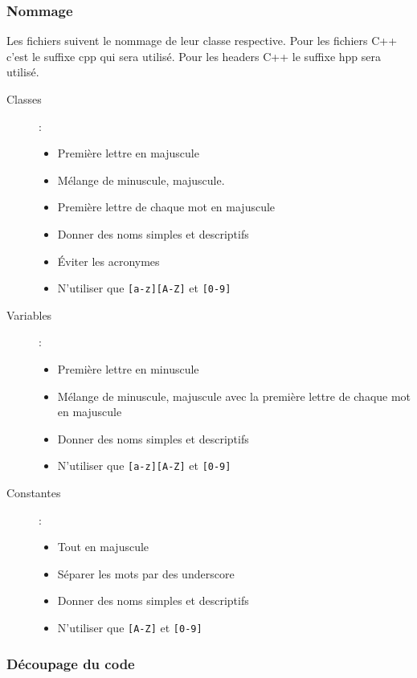 \documentclass[10pt,a4paper]{article}
\begin{document}
\subsubsection{Nommage}

Les fichiers suivent le nommage de leur classe respective.
Pour les fichiers C++ c'est le suffixe cpp qui sera utilisé. Pour les headers C++ le suffixe hpp sera utilisé.
\begin{description}
\item [Classes] :
\begin{itemize}
\item Première lettre en majuscule 
\item Mélange de minuscule, majuscule. 
\item Première lettre de chaque mot en majuscule
\item Donner des noms simples et descriptifs 
\item Éviter les acronymes 
\item N’utiliser que \verb|[a-z][A-Z]| et \verb|[0-9]|
\end{itemize}

\item [Variables] : 
\begin{itemize}
\item Première lettre en minuscule
\item Mélange de minuscule, majuscule avec la première lettre de chaque mot en majuscule 
\item Donner des noms simples et descriptifs 
\item N’utiliser que \verb|[a-z][A-Z]| et \verb|[0-9]|
\end{itemize}


\item [Constantes] :
\begin{itemize}
\item Tout en majuscule 
\item Séparer les mots par des underscore
\item Donner des noms simples et descriptifs 
\item N’utiliser que \verb|[A-Z]| et \verb|[0-9] |
\end{itemize}

\end{description}

\subsubsection{Découpage du code}
\end{document}

